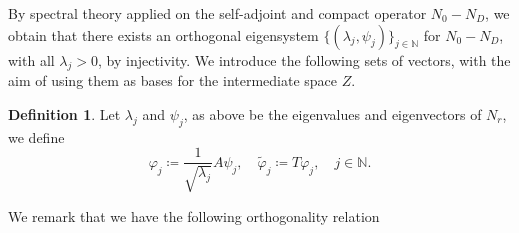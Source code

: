 \documentclass[10pt, a4paper, twoside, openright]{book}
\theoremstyle{definition}
\newtheorem{definition}[subsection]{Definition}
\theoremstyle{plain}
\theoremstyle{plain}
\theoremstyle{plain}
\theoremstyle{plain}
\theoremstyle{plain}
\theoremstyle{plain}
\theoremstyle{plain}
\theoremstyle{plain}
\let\phi\varphi
\begin{document}
% 
% 
By spectral theory applied on the self-adjoint and compact operator ${N_0}- {N_D}$, we obtain that there exists
an orthogonal eigensystem $\{(\lambda_j, \psi_j)\}_{j\in\mathbb{N}}$ for ${N_0} - {N_D}$,
with all $\lambda_j>0$, by injectivity.
We introduce the following sets of vectors, with the aim of using them as bases for the intermediate space $Z$.
\begin{definition}
Let $\lambda_j$ and $\psi_j$, as above be the eigenvalues and eigenvectors of ${N_r}$, we define
\begin{equation}
 \phi_j\coloneqq \frac{1}{\sqrt{\lambda_j}}A\psi_j, \quad \tilde{\phi}_j\coloneqq T\phi_j,\quad j\in\mathbb{N}. 
\end{equation}
\end{definition}
We remark that we have the following orthogonality relation
\end{document}
